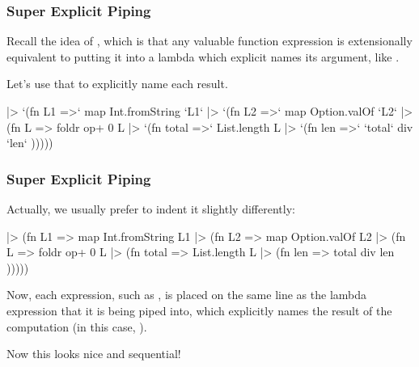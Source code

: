 \documentclass[aspectratio=169, handout]{beamer}
\begin{document}
\begin{frame}[fragile]
  \frametitle{Super Explicit Piping}

  Recall the idea of \footnotemark, which is that any valuable
  function expression  is extensionally equivalent to putting it
  into a lambda which explicit names its argument, like .

  \pause
  \vspace{\fill}

  Let's use that to explicitly name each result.

  \pause
  \vspace{\fill}

  \begin{codeblock}
    ["1", "2", "3"]
    |> `(fn L1 =>`    map Int.fromString `L1`
    |> `(fn L2 =>`    map Option.valOf `L2`
    |> (fn L =>     foldr op+ 0 L
    |> `(fn total =>` List.length L 
    |> `(fn len =>`   `total` div `len` )))))
  \end{codeblock}

\end{frame}


\begin{frame}[fragile]
  \frametitle{Super Explicit Piping}

  Actually, we usually prefer to indent it slightly differently:

  \begin{codeblock}
    ["1", "2", "3"]       |> (fn L1 =>    
    map Int.fromString L1 |> (fn L2 =>    
    map Option.valOf L2   |> (fn L =>     
    foldr op+ 0 L         |> (fn total => 
    List.length L         |> (fn len =>   
    total div len         )))))
  \end{codeblock}

  \pause
  \vspace{\fill}

  Now, each expression, such as , is placed
  on the same line as the lambda expression that it is being piped into,
  which explicitly names the result of the computation (in this case, ).

  \pause
  \vspace{\fill}

  Now this looks nice and sequential!
\end{frame}
\end{document}
